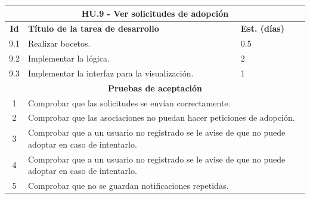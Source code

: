 \begin{tabular}{|c|p{9.5cm}|p{1cm}|}
	\hline
	\multicolumn{3}{|c|}{\textbf{HU.9 - Ver solicitudes de adopción}} \\
	\hline
	\textbf{Id} & \textbf{Título de la tarea de desarrollo} & \textbf{Est. (días)} \\
	\hline
	9.1 & Realizar bocetos. & 0.5 \\ \hline
	9.2 &  Implementar la lógica. & 2 \\ \hline
	9.3 &  Implementar la interfaz para la visualización. & 1 \\ \hline
	\multicolumn{3}{|c|}{\textbf{Pruebas de aceptación}} \\ \hline
	1 & \multicolumn{2}{|p{10cm}|}{Comprobar que las solicitudes se envían correctamente.} \\ \hline
	2 & \multicolumn{2}{|p{10cm}|}{Comprobar que las asociaciones no puedan hacer peticiones de adopción.} \\ \hline
	3 & \multicolumn{2}{|p{10cm}|}{Comprobar que a un usuario no registrado se le avise de que no puede adoptar en caso de intentarlo.} \\ \hline
	4 & \multicolumn{2}{|p{10cm}|}{Comprobar que a un usuario no registrado se le avise de que no puede adoptar en caso de intentarlo.} \\ \hline
	5 & \multicolumn{2}{|p{10cm}|}{Comprobar que no se guardan notificaciones repetidas.} \\ \hline
	
	
\end{tabular} \\ \\

